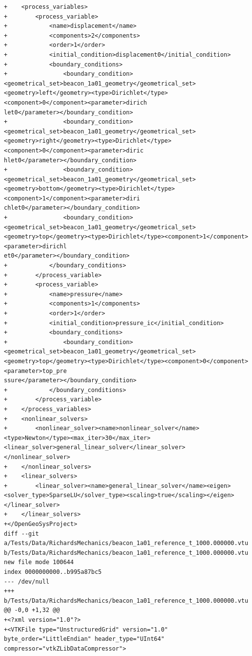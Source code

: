 \documentclass[10pt]{article}
\begin{document}
\begin{lstlisting}
+    <process_variables>
+        <process_variable>
+            <name>displacement</name>
+            <components>2</components>
+            <order>1</order>
+            <initial_condition>displacement0</initial_condition>
+            <boundary_conditions>
+                <boundary_condition><geometrical_set>beacon_1a01_geometry</geometrical_set><geometry>left</geometry><type>Dirichlet</type><component>0</component><parameter>dirich
let0</parameter></boundary_condition>
+                <boundary_condition><geometrical_set>beacon_1a01_geometry</geometrical_set><geometry>right</geometry><type>Dirichlet</type><component>0</component><parameter>diric
hlet0</parameter></boundary_condition>
+                <boundary_condition><geometrical_set>beacon_1a01_geometry</geometrical_set><geometry>bottom</geometry><type>Dirichlet</type><component>1</component><parameter>diri
chlet0</parameter></boundary_condition>
+                <boundary_condition><geometrical_set>beacon_1a01_geometry</geometrical_set><geometry>top</geometry><type>Dirichlet</type><component>1</component><parameter>dirichl
et0</parameter></boundary_condition>
+            </boundary_conditions>
+        </process_variable>
+        <process_variable>
+            <name>pressure</name>
+            <components>1</components>
+            <order>1</order>
+            <initial_condition>pressure_ic</initial_condition>
+            <boundary_conditions>
+                <boundary_condition><geometrical_set>beacon_1a01_geometry</geometrical_set><geometry>top</geometry><type>Dirichlet</type><component>0</component><parameter>top_pre
ssure</parameter></boundary_condition>
+            </boundary_conditions>
+        </process_variable>
+    </process_variables>
+    <nonlinear_solvers>
+        <nonlinear_solver><name>nonlinear_solver</name><type>Newton</type><max_iter>30</max_iter><linear_solver>general_linear_solver</linear_solver></nonlinear_solver>
+    </nonlinear_solvers>
+    <linear_solvers>
+        <linear_solver><name>general_linear_solver</name><eigen><solver_type>SparseLU</solver_type><scaling>true</scaling></eigen></linear_solver>
+    </linear_solvers>
+</OpenGeoSysProject>
diff --git a/Tests/Data/RichardsMechanics/beacon_1a01_reference_t_1000.000000.vtu b/Tests/Data/RichardsMechanics/beacon_1a01_reference_t_1000.000000.vtu
new file mode 100644
index 0000000000..b995a87bc5
--- /dev/null
+++ b/Tests/Data/RichardsMechanics/beacon_1a01_reference_t_1000.000000.vtu
@@ -0,0 +1,32 @@
+<?xml version="1.0"?>
+<VTKFile type="UnstructuredGrid" version="1.0" byte_order="LittleEndian" header_type="UInt64" compressor="vtkZLibDataCompressor">

\end{lstlisting}
\end{document}
